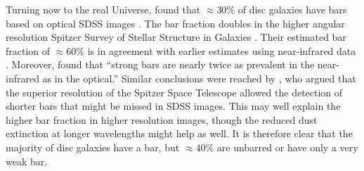 \documentclass[fleqn,usenatbib,useAMS]{mnras} %
\begin{document}
Turning now to the real Universe, \citet{Masters_2011} found that $\approx 30\%$ of disc galaxies have bars based on optical SDSS images \citep{SDSS}. The bar fraction doubles in the higher angular resolution Spitzer Survey of Stellar Structure in Galaxies \citep[S\textsuperscript{4}G;][]{Erwin_2018}. Their estimated bar fraction of $\approx 60\%$ is in agreement with earlier estimates using near-infrared data \citep{Eskridge_2000, Sheth_2008}. Moreover, \citet{Eskridge_2000} found that ``strong bars are nearly twice as prevalent in the near-infrared as in the optical.'' Similar conclusions were reached by \citet{Erwin_2018}, who argued that the superior resolution of the Spitzer Space Telescope allowed the detection of shorter bars that might be missed in SDSS images. This may well explain the higher bar fraction in higher resolution images, though the reduced dust extinction at longer wavelengths might help as well. It is therefore clear that the majority of disc galaxies have a bar, but $\approx 40\%$ are unbarred or have only a very weak bar.
\end{document}
